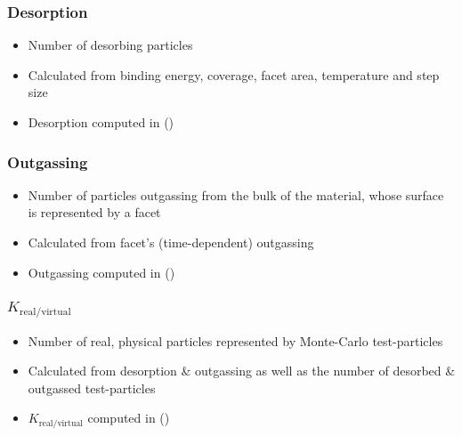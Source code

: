 \subsubsection{Desorption}
\begin{itemize}[noitemsep,topsep=0pt, partopsep=0pt]
\item Number of desorbing particles
\item Calculated from binding energy, coverage, facet area, temperature and step size
\item Desorption computed in  ()
\end{itemize}

\subsubsection{Outgassing}
\begin{itemize}[noitemsep,topsep=0pt, partopsep=0pt]
\item Number of particles outgassing from the bulk of the material, whose surface is represented by a facet
\item Calculated from facet's (time-dependent) outgassing
\item Outgassing computed in  ()
\end{itemize}

\subsubsection{$K_{\text{real}/\text{virtual}}$}
\begin{itemize}[noitemsep,topsep=0pt, partopsep=0pt]
\item Number of real, physical particles represented by Monte-Carlo test-particles
\item Calculated from desorption \& outgassing as well as the number of desorbed \& outgassed test-particles
\item $K_{\text{real}/\text{virtual}}$ computed in  ()
\end{itemize}

